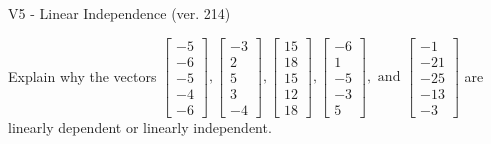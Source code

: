 \begin{exercise}
  \begin{exerciseTitle}V5 - Linear Independence (ver. 214)\end{exerciseTitle}
  \begin{exerciseStatement}
    Explain why the vectors \(\left[\begin{array}{r}
-5 \\
-6 \\
-5 \\
-4 \\
-6
\end{array}\right] , \left[\begin{array}{r}
-3 \\
2 \\
5 \\
3 \\
-4
\end{array}\right] , \left[\begin{array}{r}
15 \\
18 \\
15 \\
12 \\
18
\end{array}\right] , \left[\begin{array}{r}
-6 \\
1 \\
-5 \\
-3 \\
5
\end{array}\right] , \text{ and } \left[\begin{array}{r}
-1 \\
-21 \\
-25 \\
-13 \\
-3
\end{array}\right]\) are linearly dependent or linearly independent.	



\end{exerciseStatement}
\end{exercise}
